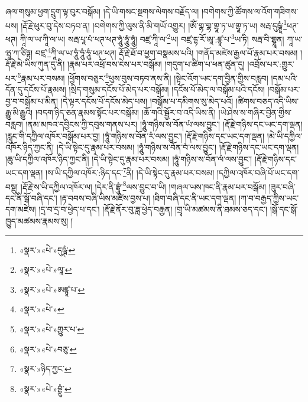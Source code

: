 ཞལ་གསུམ་ཕྱག་དྲུག་ལྟ་བུར་བསྒོམ། །དེ་ཡི་གསང་སྔགས་ལེགས་བརྗོད་ལ། །བགེགས་ཀྱི་ཚོགས་ལ་འོག་གཟིགས་པས། །རྡོ་རྗེ་ཕུར་བུ་དེས་བཏབ་ན། །བགེགས་ཀྱི་ལུས་ནི་མི་གཡོ་འགྱུར། །ཨོཾ་གྷ་གྷ་གྷཱ་ཏ་ཡ་གྷཱ་ཏ་ཡ། སརྦ་དུཥྚཱཾ་\footnote{«སྣར་»«པེ་»དུཥྚཾ་}ཕཊ་ཕཊ། ཀཱི་ལ་ཡ་ཀཱི་ལ་ཡ། སརྦ་པཱ་པཾ་ཕཊ་ཕཊ་ཧཱུཾ་ཧཱུཾ་ཧཱུཾ། བཛྲ་ཀཱི་ལ་\footnote{«སྣར་»«པེ་»ལཱ་}ཡ། བཛྲ་དྷ་རོ་ཨཱ་:ཛྙཱ་པ་\footnote{«སྣར་»«པེ་»ཨཛྙཱ་པ་}ཡ་ཏི། སརྦ་བི་གྷྣཱན། ཀཱ་ཡ་ཝཱ་ཀ་ཙིཏྟ། བཛྲ་\footnote{«སྣར་»«པེ་»}ཀཱི་ལ་ཡ་ཧཱུཾ་ཧཱུཾ་ཧཱུཾ་ཕཊ་ཕཊ། རྡོ་རྗེ་ཐོ་བ་ཕྱག་བསྣམས་པའི། །གནོད་མཛེས་རྒྱལ་པོ་རྣམ་པར་བསམ། །རྡོ་རྗེ་མེ་ཡིས་ཀུན་དུ་ནི། །རྣམ་པར་འཕྲོ་བས་ངེས་པར་བསྒོམ། །གདུག་པ་ཚིག་པ་ཕན་ཚུན་དུ། །འབྲོས་པར་:གྱུར་པར་\footnote{«སྣར་»«པེ་»གྱུར་པ་}རྣམ་པར་བསམ། །ཕྱོགས་བཅུར་\footnote{«སྣར་»«པེ་»བཅུ་}ཕུས་བུས་བཏབ་ནས་ནི། །སྟེང་འོག་ཡང་དག་བྱིན་གྱིས་བརླབ། །དམ་པའི་དོན་དུ་དངོས་པོ་རྣམས། །སྲིད་གསུམ་དངོས་པོ་མེད་པར་བསྒོམ། །དངོས་པོ་མེད་ལ་བསྒོམ་པའི་དངོས། །བསྒོམ་པར་བྱ་བ་བསྒོམ་པ་མིན། །དེ་ལྟར་དངོས་པོ་དངོས་མེད་པས། །བསྒོམ་པ་དམིགས་སུ་མེད་པའོ། །ཚིགས་བཅད་འདི་ཡིས་རྒྱུ་མི་རྒྱུའི། །བདག་ཉིད་ཅན་རྣམས་སྟོང་པར་བསྒོམ། །ཆོ་གའི་སྦྱོར་བ་འདི་ཡིས་ནི། །ཡེ་ཤེས་ས་གཞིར་བྱིན་གྱིས་བརླབ། །ནམ་མཁའ་དབྱིངས་ཀྱི་དབུས་གནས་པར། །ཧཱུཾ་གཉིས་ས་བོན་ཡཾ་ལས་བྱུང་། །རྡོ་རྗེ་གཉིས་དང་ཡང་དག་ལྡན། །རླུང་གི་དཀྱིལ་འཁོར་བསྒོམ་པར་བྱ། །ཧཱུཾ་གཉིས་ས་བོན་རཾ་ལས་བྱུང་། །རྡོ་རྗེ་གཉིས་དང་ཡང་དག་ལྡན། །མེ་ཡི་དཀྱིལ་འཁོར་ཉིད་ཀྱང་ནི། །དེ་ཡི་སྟེང་དུ་རྣམ་པར་བསམ། །ཧཱུཾ་གཉིས་ས་བོན་བཾ་ལས་བྱུང་། །རྡོ་རྗེ་གཉིས་དང་ཡང་དག་ལྡན། །ཆུ་ཡི་དཀྱིལ་འཁོར་ཉིད་ཀྱང་ནི། །དེ་ཡི་སྟེང་དུ་རྣམ་པར་བསམ། །ཧཱུཾ་གཉིས་ས་བོན་ལཾ་ལས་བྱུང་། །རྡོ་རྗེ་གཉིས་དང་ཡང་དག་ལྡན། །ས་ཡི་དཀྱིལ་འཁོར་:ཉིད་དང་\footnote{«སྣར་»ཉིད་ཀྱང་}ནི། །དེ་ཡི་སྟེང་དུ་རྣམ་པར་བསམ། །དཀྱིལ་འཁོར་བཞི་པོ་ཡང་དག་བསྡུ། །རྡོ་རྗེ་ས་ཡི་དཀྱིལ་འཁོར་ལ། །དེར་ནི་བྷྲཱུཾ་\footnote{«སྣར་»«པེ་»བྷྲུཾ་}ལས་བྱུང་བ་ཡི། །གཞལ་ཡས་ཁང་ནི་རྣམ་པར་བསྒོམ། །ཟུར་བཞི་དང་ནི་སྒོ་བཞི་དང་། །རྟ་བབས་བཞི་ཡིས་མཛེས་བྱས་པ། །ཐིག་བཞི་དང་ནི་ཡང་དག་ལྡན། །ཀ་བ་བརྒྱད་ཀྱིས་ཡང་དག་མཛེས། །དྲ་བ་དྲ་བ་ཕྱེད་པ་དང་། །རྡོ་རྗེ་ནོར་བུ་ཟླ་ཕྱེད་བརྒྱན། །གྲྭ་ཡི་མཚམས་ནི་ཐམས་ཅད་དང་། །སྒོ་དང་སྒོ་ཁྱུད་མཚམས་རྣམས་སུ། །
